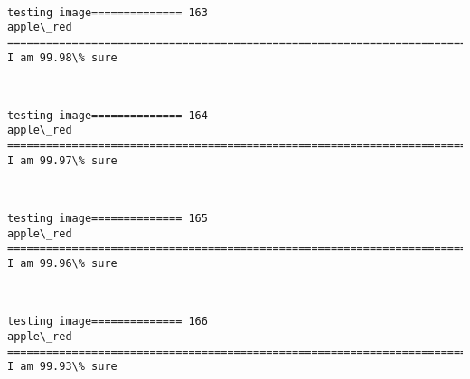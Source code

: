 \documentclass[11pt]{article}
\begin{document}
    \begin{center}
    \end{center}
    { \hspace*{\fill} \\}
    
    \begin{Verbatim}[commandchars=\\\{\}]
testing image============== 163
apple\_red
============================================================================
I am 99.98\% sure

    \end{Verbatim}

    \begin{center}
    \end{center}
    { \hspace*{\fill} \\}
    
    \begin{Verbatim}[commandchars=\\\{\}]
testing image============== 164
apple\_red
============================================================================
I am 99.97\% sure

    \end{Verbatim}

    \begin{center}
    \end{center}
    { \hspace*{\fill} \\}
    
    \begin{Verbatim}[commandchars=\\\{\}]
testing image============== 165
apple\_red
============================================================================
I am 99.96\% sure

    \end{Verbatim}

    \begin{center}
    \end{center}
    { \hspace*{\fill} \\}
    
    \begin{Verbatim}[commandchars=\\\{\}]
testing image============== 166
apple\_red
============================================================================
I am 99.93\% sure

    \end{Verbatim}
\end{document}
